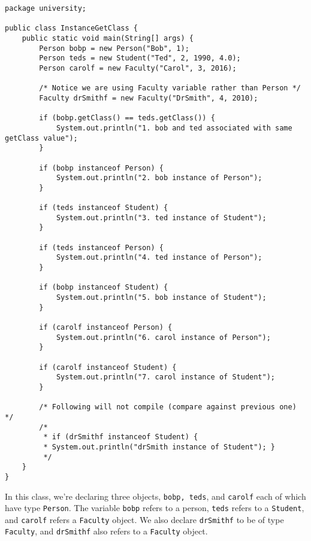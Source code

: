 \begin{lstlisting}
package university;

public class InstanceGetClass {
	public static void main(String[] args) {
		Person bobp = new Person("Bob", 1);
		Person teds = new Student("Ted", 2, 1990, 4.0);
		Person carolf = new Faculty("Carol", 3, 2016);

		/* Notice we are using Faculty variable rather than Person */
		Faculty drSmithf = new Faculty("DrSmith", 4, 2010);

		if (bobp.getClass() == teds.getClass()) {
			System.out.println("1. bob and ted associated with same getClass value");
		}

		if (bobp instanceof Person) {
			System.out.println("2. bob instance of Person");
		}

		if (teds instanceof Student) {
			System.out.println("3. ted instance of Student");
		}

		if (teds instanceof Person) {
			System.out.println("4. ted instance of Person");
		}

		if (bobp instanceof Student) {
			System.out.println("5. bob instance of Student");
		}

		if (carolf instanceof Person) {
			System.out.println("6. carol instance of Person");
		}

		if (carolf instanceof Student) {
			System.out.println("7. carol instance of Student");
		}

		/* Following will not compile (compare against previous one) */
		/*
		 * if (drSmithf instanceof Student) {
		 * System.out.println("drSmith instance of Student"); }
		 */
	}
}
\end{lstlisting}

In this class, we're declaring three objects, \verb!bobp, teds!, and \verb!carolf! each of which have type \verb!Person!. The variable \verb!bobp! refers to a person, \verb!teds! refers to a \verb!Student!, and \verb!carolf! refers a \verb!Faculty! object. We also declare \verb!drSmithf! to be of type \verb!Faculty!, and \verb!drSmithf! also refers to a \verb!Faculty! object.



